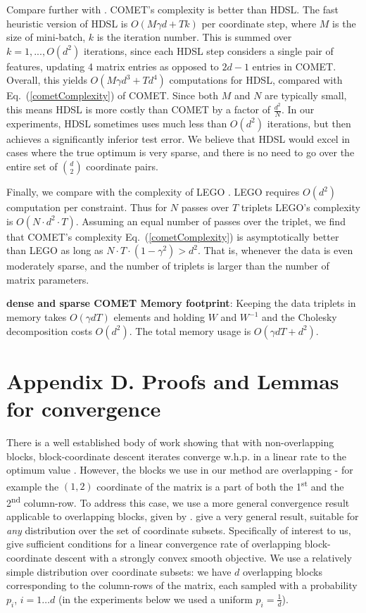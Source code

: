 \documentclass[twoside,11pt]{article}
\newcommand\mat[1]{{#1}}
\newcommand{\W}{\mat{W}}
\renewcommand{\eqref}[1]{Eq.~(\ref{#1})}
\begin{document}
Compare further with \citet{HDSL}. COMET’s complexity is better than HDSL. The fast heuristic version of HDSL is $O(M\gamma d+Tk)$ per coordinate step, where $M$ is the size of mini-batch, $k$ is the iteration number. This is summed over $k=1,...,O(d^2)$ iterations, since each HDSL step considers a single pair of features, updating 4 matrix entries as opposed to $2d-1$ entries in COMET. Overall, this yields $O(M\gamma d^3+Td^4)$ computations for HDSL, compared with \eqref{cometComplexity} of COMET. Since both $M$ and $N$ are typically small, this means HDSL is more costly than COMET by a factor of $\frac{d^2}{N}$. In our experiments, HDSL sometimes uses much less than $O(d^2)$ iterations, but then achieves a significantly inferior test error. We believe that HDSL would excel in cases where the true optimum is very sparse, and there is no need to go over the entire set of $d \choose 2$ coordinate pairs.

Finally, we compare with the complexity of LEGO \citep{lego}. LEGO requires $O(d^2)$ computation per constraint. Thus for $N$ passes over $T$ triplets LEGO's complexity is $O(N\cdot d^2 \cdot T)$. Assuming an equal number of passes over the triplet, we find that COMET's complexity \eqref{cometComplexity} is asymptotically better than LEGO as long as $N \cdot T \cdot (1-\gamma^2) > d^2$. That is, whenever the data is even moderately sparse, and the number of triplets is larger than the number of matrix parameters.

{\bf dense and sparse COMET Memory footprint}: Keeping the data triplets in memory takes $O(\gamma d T)$ elements and holding $\W$ and $\W^{-1}$ and the Cholesky decomposition costs $O(d^2)$. The total memory usage is $O(\gamma d T + d^2)$. 


\section*{Appendix D. Proofs and Lemmas for convergence}

There is a well established body of work showing that with non-overlapping blocks, block-coordinate descent iterates converge w.h.p. in a linear rate to the optimum value \citep{nesterov2012efficiency,richtarik2014iteration}.
However, the blocks we use in our method are overlapping - for example the $(1,2)$ coordinate of the matrix is a part of both the 1\textsuperscript{st} and the 2\textsuperscript{nd} column-row. To address this case, we use a more general convergence result applicable to overlapping blocks, given by \citet{richtarik2013optimal}. \citeauthor{richtarik2013optimal} give a very general result, suitable for \emph{any} distribution over the set of coordinate subsets. 
Specifically of interest to us, \citeauthor{richtarik2013optimal} give sufficient conditions for a linear convergence rate of overlapping block-coordinate descent with a strongly convex smooth objective. 
We use a relatively simple distribution over coordinate subsets: we have $d$ overlapping blocks corresponding to the column-rows of the matrix, each sampled with a probability $p_i$, $i=1 \ldots d$ (in the experiments below we used a uniform $p_i = \frac{1}{d}$).
\end{document}
